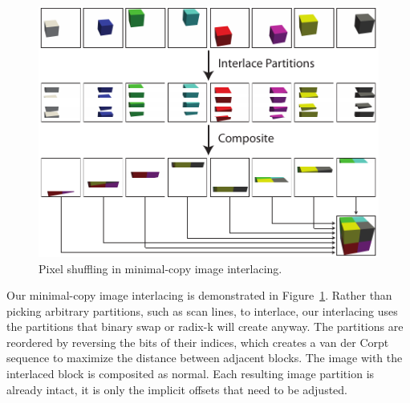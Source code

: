 \documentclass{acm_proc_article-sp}
\begin{document}
\begin{figure}[htbp]
  \centering
  \includegraphics{images/InterlaceDiagram}
  \caption{Pixel shuffling in minimal-copy image interlacing.}
  \label{fig:Interlacing}
\end{figure}

Our minimal-copy image interlacing is demonstrated in
Figure~\ref{fig:Interlacing}.  Rather than picking arbitrary partitions,
such as scan lines, to interlace, our interlacing uses the partitions that
binary swap or radix-k will create anyway.  The partitions are reordered by
reversing the bits of their indices, which creates a van der Corpt sequence
to maximize the distance between adjacent blocks.  The image with the
interlaced block is composited as normal.  Each resulting image partition
is already intact, it is only the implicit offsets that need to be
adjusted.
\end{document}
